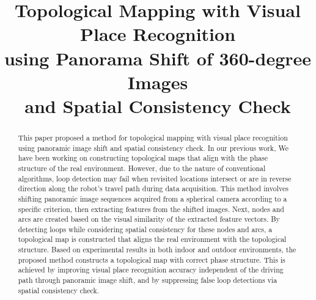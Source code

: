\documentclass[conference]{IEEEtran}
\begin{document}
\captionsetup{skip=2pt} %

\title{\LARGE \bf Topological Mapping with Visual Place Recognition \\
using Panorama Shift of 360-degree Images \\
and Spatial Consistency Check\\
}

\author{
\and
{}
\and
{}
}

\maketitle

\begin{abstract}
This paper proposed a method for topological mapping with visual place recognition using panoramic image shift and spatial consistency check.
In our previous work, We have been working on constructing topological maps that align with the phase structure of the real environment. However, due to the nature of conventional algorithms, loop detection may fail when revisited locations intersect or are in reverse direction along the robot's travel path during data acquisition.
This method involves shifting panoramic image sequences acquired from a spherical camera according to a specific criterion, then extracting features from the shifted images.
Next, nodes and arcs are created based on the visual similarity of the extracted feature vectors.
By detecting loops while considering spatial consistency for these nodes and arcs, a topological map is constructed that aligns the real environment with the topological structure.
Based on experimental results in both indoor and outdoor environments, the proposed method constructs a topological map with correct phase structure.
This is achieved by improving visual place recognition accuracy independent of the driving path through panoramic image shift, and by suppressing false loop detections via spatial consistency check.
\end{abstract}
\end{document}
